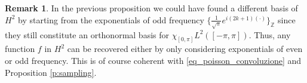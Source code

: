 \documentclass[12pt,a4paper,reqno]{amsart}
\theoremstyle{definition}
\newtheorem{rmk}[thm]{Remark}
\theoremstyle{definition}\newtheorem{defn}[thm]{Definition}
\newcommand{\nb}[3]{{\colorbox{#2}{\bfseries\sffamily\scriptsize\textcolor{white}{#1}}} 
    {\textcolor{#2}{\sf\small\textit{#3}}}}
\newcommand{\eug}[1]{\nb{Eug}{jazzberryjam}{#1}}
\newcommand{\ale}[1]{\nb{Ale}{teal}{#1}}
\begin{document}
    
    
    
    

    \begin{rmk}
        In the previous proposition we could have found a different basis of $H^2$ by starting from the exponentials of odd frequency $\{\frac{1}{\sqrt{\pi}}e^{i(2k+1)(\cdot)}\}_{\mathbb Z}$ since they still constitute an orthonormal basis for $\chi_{[0,\pi]}L^2([-\pi,\pi])$. Thus, any function $f$ in $H^2$ can be recovered either by only considering exponentials of even or odd frequency. This is of course coherent with \eqref{eq_poisson_convoluzione} and Proposition \ref{p:sampling}.
    \end{rmk}
    
\end{document}
